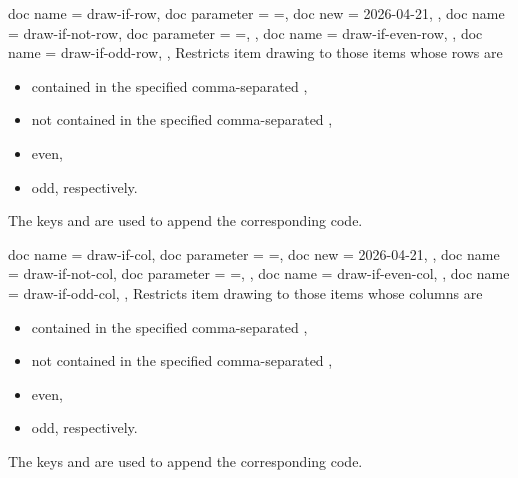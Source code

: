 \documentclass[a4paper,11pt]{article}
\begin{document}
\clearpage

\begin{docKeys}
  [
      doc keypath     = tikz/geomarray,
      doc description = {initially unset},
  ]
  {
    {
      doc name        = draw-if-row,
      doc parameter   = {=},
      doc new         = 2026-04-21,
    },
    {
      doc name        = draw-if-not-row,
      doc parameter   = {=},
    },
    {
      doc name        = draw-if-even-row,
    },
    {
      doc name        = draw-if-odd-row,
    },
  }
  Restricts item drawing to those items whose rows are
  \begin{itemize}
  \item contained in the specified comma-separated ,
  \item not contained in the specified comma-separated ,
  \item even,
  \item odd, respectively.
  \end{itemize}
  The keys  and 
  are used to append the corresponding code.
\end{docKeys}


\begin{docKeys}
  [
      doc keypath     = tikz/geomarray,
      doc description = {initially unset},
  ]
  {
    {
      doc name        = draw-if-col,
      doc parameter   = {=},
      doc new         = 2026-04-21,
    },
    {
      doc name        = draw-if-not-col,
      doc parameter   = {=},
    },
    {
      doc name        = draw-if-even-col,
    },
    {
      doc name        = draw-if-odd-col,
    },
  }
  Restricts item drawing to those items whose columns are
  \begin{itemize}
  \item contained in the specified comma-separated ,
  \item not contained in the specified comma-separated ,
  \item even,
  \item odd, respectively.
  \end{itemize}
  The keys  and 
  are used to append the corresponding code.
\end{docKeys}
\end{document}

